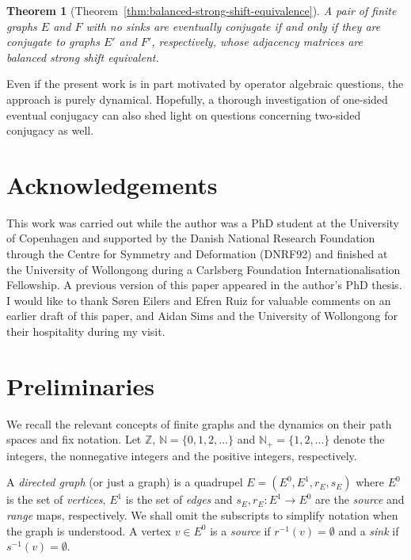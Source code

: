 \documentclass[12pt,a4paper,oneside,reqno,final]{amsart}
\newcommand{\LRA}{\longrightarrow}
\newcommand{\N}{\mathbb{N}}
\newcommand{\Z}{\mathbb{Z}}
\newtheorem*{theorem*}{Theorem}
\theoremstyle{definition}
\numberwithin{equation}{section} %
\begin{document}
\begin{theorem*}[Theorem~\ref{thm:balanced-strong-shift-equivalence}]
    A pair of finite graphs $E$ and $F$ with no sinks are eventually conjugate if and only if they are conjugate to graphs $E'$ and $F'$, respectively,
    whose adjacency matrices are balanced strong shift equivalent.
\end{theorem*}

Even if the present work is in part motivated by operator algebraic questions, the approach is purely dynamical.
Hopefully, a thorough investigation of one-sided eventual conjugacy can also shed light on questions concerning two-sided conjugacy as well.

\section*{Acknowledgements}
This work was carried out while the author was a PhD student at the University of Copenhagen
and supported by the Danish National Research Foundation through the Centre for Symmetry and Deformation (DNRF92)
and finished at the University of Wollongong during a Carlsberg Foundation Internationalisation Fellowship.
A previous version of this paper appeared in the author's PhD thesis.
I would like to thank Søren Eilers and Efren Ruiz for valuable comments on an earlier draft of this paper,
and Aidan Sims and the University of Wollongong for their hospitality during my visit.



\section{Preliminaries}

We recall the relevant concepts of finite graphs and the dynamics on their path spaces and fix notation.
Let $\Z$,  $\N = \{0, 1, 2,\ldots\}$ and $\N_+ = \{1, 2,\ldots\}$ denote the integers, the nonnegative integers and the positive integers, respectively.


A \emph{directed graph} (or just a graph) is a quadrupel $E = (E^0, E^1, r_E, s_E)$ where $E^0$ is the set of \emph{vertices},
$E^1$ is the set of \emph{edges} and $s_E, r_E\colon E^1\LRA E^0$ are the \emph{source} and \emph{range} maps, respectively.
We shall omit the subscripts to simplify notation when the graph is understood.
A vertex $v\in E^0$ is a \emph{source} if $r^{-1}(v) = \emptyset$ and a \emph{sink} if $s^{-1}(v) = \emptyset$. \\
\end{document}
